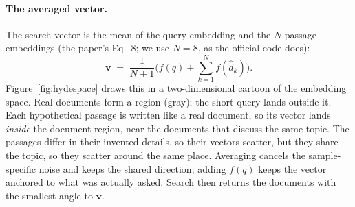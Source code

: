 \documentclass[11pt]{article}
\begin{document}
\paragraph{The averaged vector.} The search vector is the mean of the query embedding and the $N$
passage embeddings (the paper's Eq.~8; we use $N=8$, as the official code does):
\[
\mathbf v \;=\; \frac{1}{N+1}\Big(f(q) + \sum_{k=1}^{N} f(\hat d_k)\Big).
\]
Figure~\ref{fig:hydespace} draws this in a two-dimensional cartoon of the embedding space. Real
documents form a region (gray); the short query lands outside it. Each hypothetical passage is
written like a real document, so its vector lands \emph{inside} the document region, near the
documents that discuss the same topic. The passages differ in their invented details, so their
vectors scatter, but they share the topic, so they scatter around the same place. Averaging cancels
the sample-specific noise and keeps the shared direction; adding $f(q)$ keeps the vector anchored to
what was actually asked. Search then returns the documents with the smallest angle to $\mathbf v$.
\end{document}
